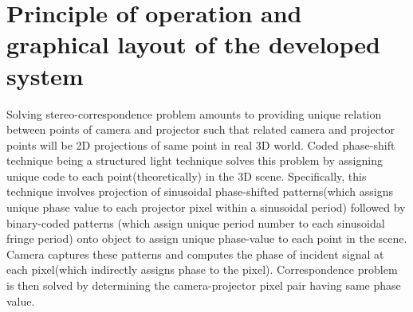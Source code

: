  
 
  
\section{Principle of operation and graphical layout of the developed system} 
Solving stereo-correspondence problem amounts to providing unique relation between points of camera and projector such that related camera and projector points will be 2D projections of same point in real 3D world. Coded phase-shift technique being a structured light technique solves this problem by assigning unique code to each point(theoretically) in the 3D scene. Specifically, this technique involves projection of sinusoidal phase-shifted patterns(which assigns unique phase value to each projector pixel within a sinusoidal period) followed by binary-coded patterns (which assign unique period number to each sinusoidal fringe period) onto object to assign unique phase-value to each point in the scene. Camera captures these patterns and computes the phase of incident signal at each pixel(which indirectly assigns phase to the pixel). Correspondence problem is then solved by determining the camera-projector pixel pair having same phase value.\newline  


